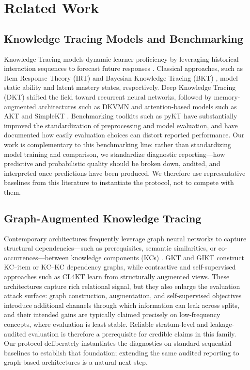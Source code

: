 \section{Related Work}
\label{sec:related}

\subsection{Knowledge Tracing Models and Benchmarking}
Knowledge Tracing models dynamic learner proficiency by leveraging historical interaction sequences to forecast future responses \citep{abdelrahman2023knowledge}. Classical approaches, such as Item Response Theory (IRT) \citep{rasch1960probabilistic,embretson2000item} and Bayesian Knowledge Tracing (BKT) \citep{corbett1994knowledge}, model static ability and latent mastery states, respectively. Deep Knowledge Tracing (DKT) \citep{piech2015deep} shifted the field toward recurrent neural networks, followed by memory-augmented architectures such as DKVMN \citep{zhang2017dynamic} and attention-based models such as AKT \citep{ghosh2020context} and SimpleKT \citep{liu2023simplekt}. Benchmarking toolkits such as pyKT \citep{liu2022pykt} have substantially improved the standardization of preprocessing and model evaluation, and have documented how easily evaluation choices can distort reported performance. Our work is complementary to this benchmarking line: rather than standardizing model training and comparison, we standardize diagnostic reporting---how predictive and probabilistic quality should be broken down, audited, and interpreted once predictions have been produced. We therefore use representative baselines from this literature to instantiate the protocol, not to compete with them.

\subsection{Graph-Augmented Knowledge Tracing}
Contemporary architectures frequently leverage graph neural networks to capture structural dependencies---such as prerequisites, semantic similarities, or co-occurrences---between knowledge components (KCs) \citep{abdelrahman2023knowledge}. GKT \citep{nakagawa2019graph} and GIKT \citep{yang2021gikt} construct KC--item or KC--KC dependency graphs, while contrastive and self-supervised approaches such as CL4KT \citep{lee2022cl4kt} learn from structurally augmented views. These architectures capture rich relational signal, but they also enlarge the evaluation attack surface: graph construction, augmentation, and self-supervised objectives introduce additional channels through which information can leak across splits, and their intended gains are typically claimed precisely on low-frequency concepts, where evaluation is least stable. Reliable stratum-level and leakage-audited evaluation is therefore a prerequisite for credible claims in this family. Our protocol deliberately instantiates the diagnostics on standard sequential baselines to establish that foundation; extending the same audited reporting to graph-based architectures is a natural next step.

